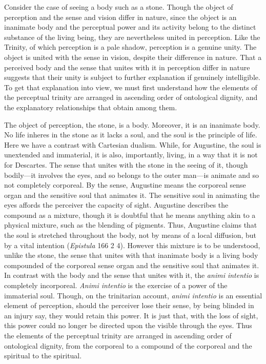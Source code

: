 \documentclass[12pt]{article}
\begin{document}
Consider the case of seeing a body such as a stone. Though the object of perception and the sense and vision differ in nature, since the object is an inanimate body and the perceptual power and its activity belong to the distinct substance of the living being, they are nevertheless united in perception. Like the Trinity, of which perception is a pale shadow, perception is a genuine unity. The object is united with the sense in vision, despite their difference in nature. That a perceived body and the sense that unites with it in perception differ in nature suggests that their unity is subject to further explanation if genuinely intelligible. To get that explanation into view, we must first understand how the elements of the perceptual trinity are arranged in ascending order of ontological dignity, and the explanatory relationships that obtain among them.

The object of perception, the stone, is a body. Moreover, it is an inanimate body. No life inheres in the stone as it lacks a soul, and the soul is the principle of life. Here we have a contrast with Cartesian dualism. While, for Augustine, the soul is unextended and immaterial, it is also, importantly, living, in a way that it is not for Descartes. The sense that unites with the stone in the seeing of it, though bodily---it involves the eyes, and so belongs to the outer man---is animate and so not completely corporeal. By the sense, Augustine means the corporeal sense organ and the sensitive soul that animates it. The sensitive soul in animating the eyes affords the perceiver the capacity of sight. Augustine describes the compound as a mixture, though it is doubtful that he means anything akin to a physical mixture, such as the blending of pigments. Thus, Augustine claims that the soul is stretched throughout the body, not by means of a local diffusion, but by a vital intention (\emph{Epistula} 166 2 4). However this mixture is to be understood, unlike the stone, the sense that unites with that inanimate body is a living body compounded of the corporeal sense organ and the sensitive soul that animates it. In contrast with the body and the sense that unites with it, the \emph{animi intentio} is completely incorporeal. \emph{Animi intentio} is the exercise of a power of the immaterial soul. Though, on the trinitarian account, \emph{animi intentio} is an essential element of perception, should the perceiver lose their sense, by being blinded in an injury say, they would retain this power. It is just that, with the loss of sight, this power could no longer be directed upon the visible through the eyes. Thus the elements of the perceptual trinity are arranged in ascending order of ontological dignity, from the corporeal to a compound of the corporeal and the spiritual to the spiritual.
\end{document}
